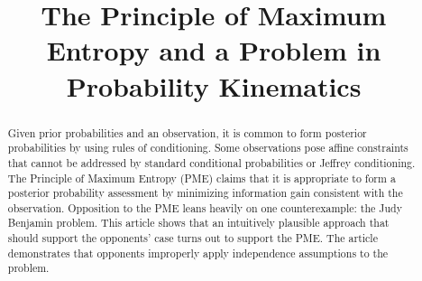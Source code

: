 \documentclass[12pt]{article}
\begin{document}
\title{The Principle of Maximum Entropy and a Problem in Probability Kinematics}

\author{}
\date{}

\maketitle

\doublespacing


\setcounter{chap}{1}


\begin{abstract}
  \noindent Given prior probabilities and an observation, it is common
  to form posterior probabilities by using rules of conditioning. Some
  observations pose affine constraints that cannot be addressed by
  standard conditional probabilities or Jeffrey conditioning. The
  Principle of Maximum Entropy (PME) claims that it is appropriate to
  form a posterior probability assessment by minimizing information
  gain consistent with the observation. Opposition to the PME leans
  heavily on one counterexample: the Judy Benjamin problem. This
  article shows that an intuitively plausible approach that should
  support the opponents' case turns out to support the PME. The
  article demonstrates that opponents improperly apply independence
  assumptions to the problem.
\end{abstract}
\end{document}
